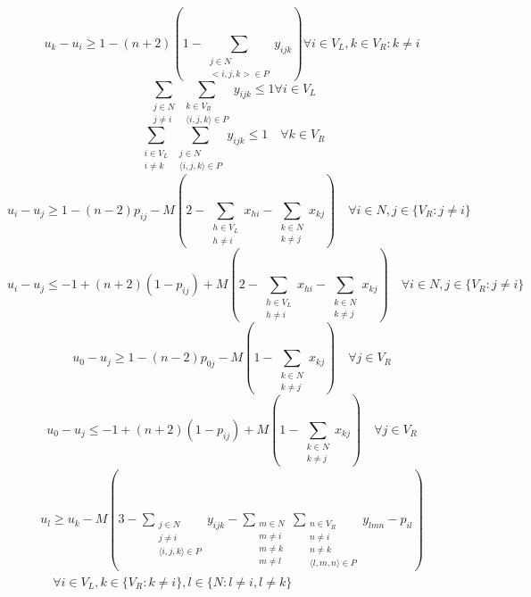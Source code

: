 \documentclass[a4paper,12pt]{report}
\begin{document}
\begin{center}
\begin{equation}
\end{equation}
\begin{equation}\label{eqn:9}
u_k-u_i \geq 1-(n+2)(1- \sum_{\substack{j \in N \\ <i,j,k> \in P}} y_{ijk}) \forall i \in V_L,k \in {V_R:k \neq i}
\end{equation}
\begin{equation}\label{eqn:10}
\sum_{\substack{j \in N \\ j \neq i}} \sum_{\substack{k \in V_R \\ \langle i,j,k \rangle \in P}} y_{ijk} \leq 1 \forall i \in V_L
\end{equation}
\begin{equation}\label{eqn:11}
\sum_{\substack{i \in V_L \\  i \neq k}} \sum_{\substack{j \in N \\ \langle i,j,k \rangle \in P}} y_{ijk} \leq 1 \quad \forall k \in V_R
\end{equation}
\begin{equation}\label{eqn:12}
u_i-u_j \geq 1-(n-2)p_{ij}-M(2-\sum_{\substack{h\in V_L \\ h \neq i}}x_{hi}-\sum_{\substack{k\in N \\ k \neq j}}x_{kj}) \quad \forall i \in N, j\in \{V_R:j \neq i\}
\end{equation}
\begin{equation}\label{eqn:13}
u_i-u_j \leq -1+(n+2)(1-p_{ij})+M(2-\sum_{\substack{h\in V_L \\ h \neq i}}x_{hi}-\sum_{\substack{k\in N \\ k \neq j}}x_{kj}) \quad \forall i \in N, j\in \{V_R:j \neq i\}
\end{equation}
\begin{equation}\label{eqn:14}
u_0-u_j \geq 1-(n-2)p_{0j}-M(1-\sum_{\substack{k\in N \\ k \neq j}}x_{kj}) \quad \forall j\in V_R
\end{equation}
\begin{equation}\label{eqn:15}
u_0-u_j \leq -1+(n+2)(1-p_{ij})+M(1-\sum_{\substack{k\in N \\ k \neq j}}x_{kj}) \quad \forall j\in V_R
\end{equation}
\begin{equation}\label{eqn:16}
\begin{array}{l}
u_l \geq u_k-M(3-\sum_{\substack{j \in N \\ j \neq i \\ \langle i,j,k \rangle \in P}}y_{ijk}-\sum_{\substack{m \in N \\ m \neq i \\ m \neq k \\ m \neq l}}\sum_{\substack{n \in V_R\\n \neq i \\ n \neq k \\ \langle l,m,n \rangle  \in P}}y_{lmn}-p_{il}) \\ \quad \forall i \in V_L,k \in \{V_R:k \neq i\},l \in \{N:l \neq i,l\neq k\}

\end{array}
\end{equation}
\end{center}
\end{document}
